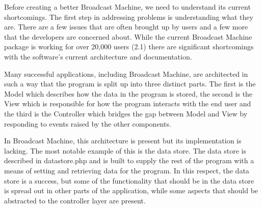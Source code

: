 \documentclass[a4paper,12pt]{report}
\begin{document}
\begin{comment}
	Another one of Broadcast Machine’s failings is in the documentation department. With an open source project like this which can possibly thrive on the contributions of users and other developers, documentation is critical. When tech savvy users have a problem and the desire to fix it, the Broadcast Machine team leaves them out to dry. For a stranger to start working on this program with little face-to-face explanation would be quite the feat. While this problem is less technical in nature, it should be a large concern to the maintainers of Broadcast Machine. Prospective developers are choosing not to hack on the project when they realize that it is often not worth their time to deconstruct the code. 
\end{comment}

	Before creating a better Broadcast Machine, we need to understand its current shortcomings. 
The first step in addressing problems is understanding what they are. 
There are a few issues that are often brought up by users and a few more that the developers are concerned about. 
While the current Broadcast Machine package is working for over 20,000 users (2.1) there are significant shortcomings with the software's current architecture and documentation.

	Many successful applications, including Broadcast Machine, are architected in such a way that the program is split up into three distinct parts. 
The first is the Model which describes how the data in the program is stored, the second is the View which is responsible for how the program interacts with the end user and the third is the Controller which bridges the gap between Model and View by responding to events raised by the other components.

	In Broadcast Machine, this architecture is present but its implementation is lacking. 
The most notable example of this is the data store. 
The data store is described in datastore.php and is built to supply the rest of the program with a means of setting and retrieving data for the program. In this respect, the data store is a success, but some of the functionality that should be in the data store is spread out in other parts of the application, while some aspects that should be abstracted to the controller layer are present.
	
\end{document}

